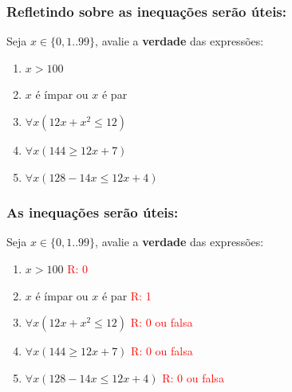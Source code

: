 \documentclass{beamer}
\begin{document}
\begin{frame}
\frametitle{Refletindo sobre as inequações serão úteis:}

\begin{exampleblock}
{Seja $x \in \{0,1..99\}$, avalie a \textbf{verdade} das expressões:}
\begin{enumerate}
  
  \item $ x > 100$
  
  \item $x$ é ímpar ou $x$ é par
  
  \item $\forall x(12x + x^2 \le 12)$

  \item $\forall x(144 \ge 12x + 7)$

  \item $\forall x(128 - 14x \le 12x + 4)$
      
      
\end{enumerate}
\end{exampleblock}
\end{frame}


\begin{frame}
\frametitle{As inequações serão úteis:}

\begin{exampleblock}
{Seja $x \in \{0,1..99\}$, avalie a \textbf{verdade} das expressões:}
\begin{enumerate}
  
  \item $ x > 100$ \hspace{1cm} \textcolor{red}{R: 0}
  
  \item $x$ é ímpar ou $x$ é par \hspace{1cm} \textcolor{red}{R: 1}

  
  \item $\forall x(12x + x^2 \le 12)$
\hspace{1cm} \textcolor{red}{R: 0 ou falsa}



  \item $\forall x(144 \ge 12x + 7)$ 
\hspace{1cm} \textcolor{red}{R: 0 ou falsa}

  \item $\forall x(128 - 14x \le 12x + 4)$ 
\hspace{1cm} \textcolor{red}{R: 0 ou falsa}
      
\end{enumerate}
\end{exampleblock}
\end{frame}
\end{document}
